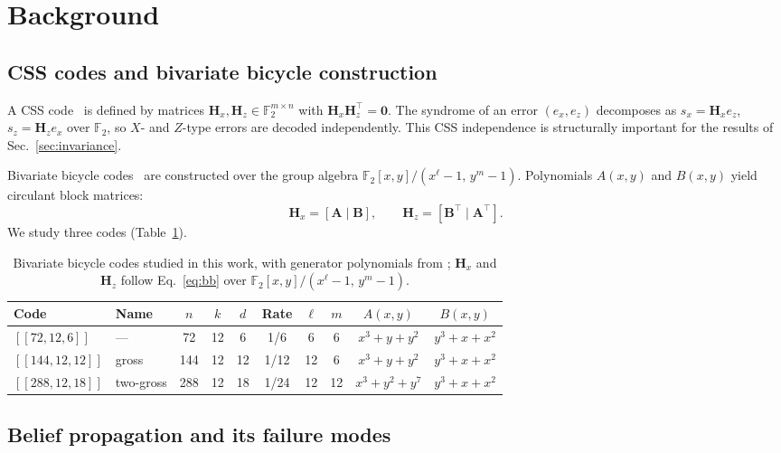 \documentclass[a4paper,twocolumn,11pt,nopdfoutputerror]{quantumarticle}
\newcommand{\F}{\mathbb{F}}
\newcommand{\Hmat}{\mathbf{H}}
\newcommand{\code}[3]{\ensuremath{[\![#1,#2,#3]\!]}}
\begin{document}
\section{Background}\label{sec:background}

\subsection{CSS codes and bivariate bicycle construction}

A CSS code~\cite{Calderbank1996Good,Steane1996Error} is defined by
matrices $\Hmat_x, \Hmat_z \in \F_2^{m \times n}$ with
$\Hmat_x \Hmat_z^\top = \mathbf{0}$. The syndrome of an error
$(e_x, e_z)$ decomposes as
$s_x = \Hmat_x e_z$,
$s_z = \Hmat_z e_x$
over $\F_2$, so $X$- and $Z$-type errors are decoded independently.
This CSS independence is structurally important for the results
of Sec.~\ref{sec:invariance}.

Bivariate bicycle codes~\cite{Bravyi2024Memory} are constructed
over the group algebra $\F_2[x,y]/(x^\ell-1,\,y^m-1)$. Polynomials
$A(x,y)$ and $B(x,y)$ yield circulant block matrices:
\begin{equation}
\Hmat_x = [\mathbf{A} \mid \mathbf{B}], \qquad
\Hmat_z = [\mathbf{B}^\top \mid \mathbf{A}^\top].
\label{eq:bb}
\end{equation}
We study three codes (Table~\ref{tab:codes}).

\begin{table}[t]
\centering
\caption{Bivariate bicycle codes studied in this work, with
         generator polynomials from \cite{Bravyi2024Memory};
         $\Hmat_x$ and $\Hmat_z$ follow Eq.~\eqref{eq:bb} over
         $\F_2[x,y]/(x^\ell-1,\,y^m-1)$.}
\label{tab:codes}
\begin{tabular}{@{}llcccccccc@{}}
\toprule
Code & Name & $n$ & $k$ & $d$ & Rate & $\ell$ & $m$ & $A(x,y)$ & $B(x,y)$ \\
\midrule
$\code{72}{12}{6}$   & ---       &  72 & 12 &  6 & 1/6  &  6 &  6 & $x^3+y+y^2$   & $y^3+x+x^2$ \\
$\code{144}{12}{12}$ & gross     & 144 & 12 & 12 & 1/12 & 12 &  6 & $x^3+y+y^2$   & $y^3+x+x^2$ \\
$\code{288}{12}{18}$ & two-gross & 288 & 12 & 18 & 1/24 & 12 & 12 & $x^3+y^2+y^7$ & $y^3+x+x^2$ \\
\bottomrule
\end{tabular}
\end{table}

\subsection{Belief propagation and its failure modes}\label{sec:bp}
\end{document}

